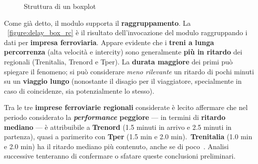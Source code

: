 \documentclass[12pt,italian]{report}
\begin{document}
\begin{figure}[h] \centering
    \caption{Struttura di un boxplot}
    \label{figure:boxplot}
\end{figure}

Come già detto, il modulo supporta il \textbf{raggruppamento}.  La
\figurename~\ref{figure:delay_box_rc} è il risultato dell'invocazione
del modulo raggruppando i dati per \textbf{impresa ferroviaria}.
Appare evidente che i \textbf{treni a lunga percorrenza} (alta
velocità e intercity) sono generalmente \textbf{più in ritardo} dei
regionali (Trenitalia, Trenord e Tper).  La \textbf{durata maggiore}
dei primi può spiegare il fenomeno; si può considerare \textit{meno
    rilevante} un ritardo di pochi minuti su un \textbf{viaggio lungo}
(nonostante il disagio per il viaggiatore, specialmente in caso di
coincidenze, sia potenzialmente lo stesso).

Tra le tre \textbf{imprese ferroviarie regionali} considerate è lecito
affermare che nel periodo considerato la \textbf{\textit{performance}
    peggiore} --- in termini di \textbf{ritardo mediano} --- è
attribuibile a \textbf{Trenord} (1.5 minuti in arrivo e 2.5 minuti in
partenza), quasi a parimerito con \textbf{Tper} (1.5 min e 2.0
min).\@~\textbf{Trenitalia} (1.0 min e 2.0 min) ha il ritardo mediano
più contenuto, anche se di poco~\cite[C]{StatJup}.  Analisi successive
tenteranno di confermare o sfatare queste conclusioni preliminari.
\end{document}
